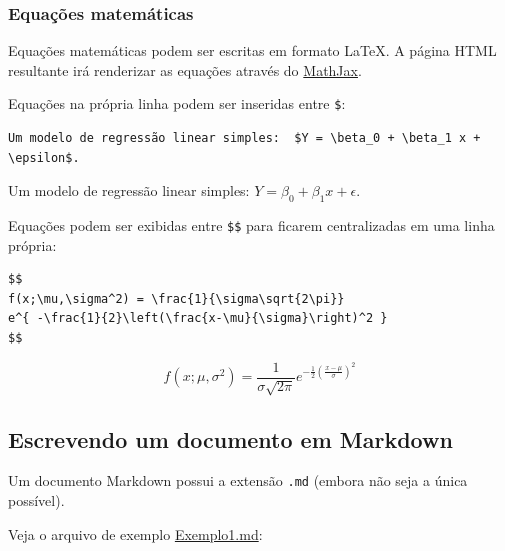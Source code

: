 \documentclass[10pt,a4paper]{book}
\begin{document}
\subsubsection*{Equações
matemáticas}\label{equauxe7uxf5es-matemuxe1ticas}


Equações matemáticas podem ser escritas em formato LaTeX. A página HTML
resultante irá renderizar as equações através do
\href{http://www.mathjax.org}{MathJax}.

Equações na própria linha podem ser inseridas entre \texttt{\$}:

\begin{verbatim}
Um modelo de regressão linear simples:  $Y = \beta_0 + \beta_1 x + \epsilon$.
\end{verbatim}

Um modelo de regressão linear simples:
\(Y = \beta_0 + \beta_1 x + \epsilon\).

Equações podem ser exibidas entre \texttt{\$\$} para ficarem
centralizadas em uma linha própria:

\begin{verbatim}
$$
f(x;\mu,\sigma^2) = \frac{1}{\sigma\sqrt{2\pi}}
e^{ -\frac{1}{2}\left(\frac{x-\mu}{\sigma}\right)^2 }
$$
\end{verbatim}

\[
f(x;\mu,\sigma^2) = \frac{1}{\sigma\sqrt{2\pi}}
e^{ -\frac{1}{2}\left(\frac{x-\mu}{\sigma}\right)^2 }
\]

\subsection{Escrevendo um documento em
Markdown}\label{escrevendo-um-documento-em-markdown}

Um documento Markdown possui a extensão \texttt{.md} (embora não seja a
única possível).

Veja o arquivo de exemplo \href{exemplos/Exemplo1.md}{Exemplo1.md}:
\end{document}
